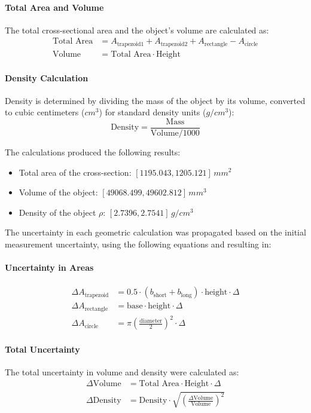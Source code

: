 \documentclass{article}
\begin{document}
\paragraph{Total Area and Volume}
The total cross-sectional area and the object's volume are calculated as:
\begin{align*}
\text{Total Area} &= A_{\text{trapezoid1}} + A_{\text{trapezoid2}} + A_{\text{rectangle}} - A_{\text{circle}} \\
\text{Volume} &= \text{Total Area} \cdot \text{Height}
\end{align*}

\paragraph{Density Calculation}
Density is determined by dividing the mass of the object by its volume, converted to cubic centimeters (\(cm^3\)) for standard density units (\(g/cm^3\)):
\[
\text{Density} = \frac{\text{Mass}}{\text{Volume} / 1000}
\]

The calculations produced the following results:
\begin{itemize}
  \item Total area of the cross-section: \([1195.043, 1205.121] \, mm^2\)
  \item Volume of the object: \([49068.499, 49602.812] \, mm^3\)
  \item Density of the object \(\rho\): \([2.7396, 2.7541] \, g/cm^3\)
\end{itemize}

The uncertainty in each geometric calculation was propagated based on the initial measurement uncertainty, using the following equations and resulting in:

\paragraph{Uncertainty in Areas}
\begin{align*}
\Delta A_{\text{trapezoid}} &= 0.5 \cdot (b_{\text{short}} + b_{\text{long}}) \cdot \text{height} \cdot \Delta \\
\Delta A_{\text{rectangle}} &= \text{base} \cdot \text{height} \cdot \Delta \\
\Delta A_{\text{circle}} &= \pi \left(\frac{\text{diameter}}{2}\right)^2 \cdot \Delta
\end{align*}

\paragraph{Total Uncertainty}
The total uncertainty in volume and density were calculated as:
\begin{align*}
\Delta \text{Volume} &= \text{Total Area} \cdot \text{Height} \cdot \Delta \\
\Delta \text{Density} &= \text{Density} \cdot \sqrt{\left(\frac{\Delta \text{Volume}}{\text{Volume}}\right)^2}
\end{align*}
\end{document}

